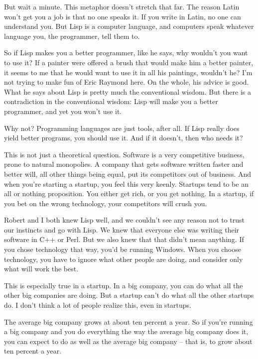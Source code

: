 \documentclass[10pt,twoside,openright]{memoir}
\begin{document}
But wait a minute. This metaphor doesn't stretch that far. The reason Latin won't get you a job is that no one speaks it. If you write in Latin, no one can understand you. But Lisp is a computer language, and computers speak whatever language you, the programmer, tell them to.

So if Lisp makes you a better programmer, like he says, why wouldn't you want to use it? If a painter were offered a brush that would make him a better painter, it seems to me that he would want to use it in all his paintings, wouldn't he? I'm not trying to make fun of Eric Raymond here. On the whole, his advice is good. What he says about Lisp is pretty much the conventional wisdom. But there is a contradiction in the conventional wisdom: Lisp will make you a better programmer, and yet you won't use it.

Why not? Programming languages are just tools, after all. If Lisp really does yield better programs, you should use it. And if it doesn't, then who needs it?

This is not just a theoretical question. Software is a very competitive business, prone to natural monopolies. A company that gets software written faster and better will, all other things being equal, put its competitors out of business. And when you're starting a startup, you feel this very keenly. Startups tend to be an all or nothing proposition. You either get rich, or you get nothing. In a startup, if you bet on the wrong technology, your competitors will crush you.

Robert and I both knew Lisp well, and we couldn't see any reason not to trust our instincts and go with Lisp. We knew that everyone else was writing their software in C++ or Perl. But we also knew that that didn't mean anything. If you chose technology that way, you'd be running Windows. When you choose technology, you have to ignore what other people are doing, and consider only what will work the best.

This is especially true in a startup. In a big company, you can do what all the other big companies are doing. But a startup can't do what all the other startups do. I don't think a lot of people realize this, even in startups.

The average big company grows at about ten percent a year. So if you're running a big company and you do everything the way the average big company does it, you can expect to do as well as the average big company -- that is, to grow about ten percent a year.
\end{document}
